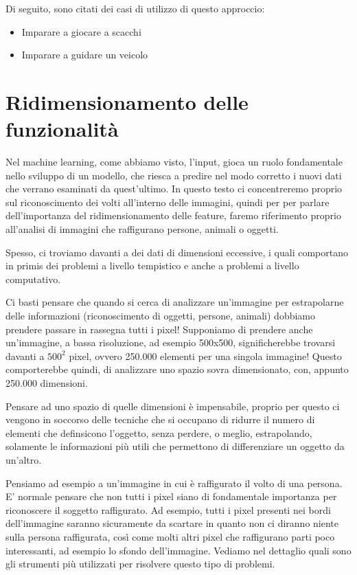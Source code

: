 \documentclass[12pt,italian]{report}
\begin{document}
Di seguito, sono citati dei casi di utilizzo di questo approccio:

\begin{itemize}
	\item Imparare a giocare a scacchi
	\item Imparare a guidare un veicolo
\end{itemize}

\pagebreak
\section{Ridimensionamento delle funzionalità}

    Nel machine learning, come abbiamo visto, l'input, gioca un ruolo fondamentale nello sviluppo di un modello, che riesca a predire nel modo corretto i nuovi dati che verrano esaminati da quest'ultimo.
In questo testo ci concentreremo proprio sul riconoscimento dei volti all'interno delle immagini, quindi per per parlare dell'importanza del ridimensionamento delle feature, faremo riferimento proprio all'analisi di immagini che raffigurano persone, animali o oggetti.

Spesso, ci troviamo davanti a dei dati di dimensioni eccessive, i quali comportano in primis dei problemi a livello tempistico e anche a problemi a livello computativo.

Ci basti pensare che quando si cerca di analizzare un'immagine per estrapolarne delle informazioni (riconoscimento di oggetti, persone, animali) dobbiamo prendere passare in rassegna tutti i pixel! Supponiamo di prendere anche un'immagine, a bassa risoluzione, ad esempio 500x500, significherebbe trovarsi davanti a $ 500^2 $ pixel, ovvero 250.000 elementi per una singola immagine! Questo comporterebbe quindi, di analizzare uno spazio sovra dimensionato, con, appunto 250.000 dimensioni.

Pensare ad uno spazio di quelle dimensioni è impensabile, proprio per questo ci vengono in soccorso delle tecniche che si occupano di ridurre il numero di elementi che definsicono l'oggetto, senza perdere, o meglio, estrapolando, solamente le informazioni più utili che permettono di differenziare un oggetto da un'altro.

Pensiamo ad esempio a un'immagine in cui è raffigurato il volto di una persona. E' normale pensare che non tutti i pixel siano di fondamentale importanza per riconoscere il soggetto raffigurato. Ad esempio, tutti i pixel presenti nei bordi dell'immagine saranno sicuramente da scartare in quanto non ci diranno niente sulla persona raffigurata, così come molti altri pixel che raffigurano parti poco interessanti, ad esempio lo sfondo dell'immagine. Vediamo nel dettaglio quali sono gli strumenti più utilizzati per risolvere questo tipo di problemi.
\end{document}

